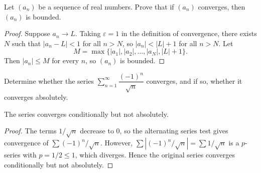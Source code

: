 \documentclass[name=Ada\ Lovelace, regnum=2027001, course=Real\ Analysis, num=6]{assignment}
\begin{document}
\maketitle

Let $(a_n)$ be a sequence of real numbers. Prove that if $(a_n)$
converges, then $(a_n)$ is bounded.

\begin{proof}
Suppose $a_n \to L$. Taking $\varepsilon = 1$ in the definition of
convergence, there exists $N$ such that $|a_n - L| < 1$ for all $n > N$,
so $|a_n| < |L| + 1$ for all $n > N$. Let
\[
  M = \max\{ |a_1|, |a_2|, \dots, |a_N|, |L| + 1 \}.
\]
Then $|a_n| \le M$ for every $n$, so $(a_n)$ is bounded.
\end{proof}

\separator

Determine whether the series $\sum_{n=1}^{\infty} \dfrac{(-1)^n}{\sqrt{n}}$
converges, and if so, whether it converges absolutely.

\begin{claim}
The series converges conditionally but not absolutely.
\end{claim}

\begin{proof}
The terms $1/\sqrt{n}$ decrease to $0$, so the alternating series test
gives convergence of $\sum (-1)^n / \sqrt{n}$. However,
$\sum |(-1)^n/\sqrt{n}| = \sum 1/\sqrt{n}$ is a $p$-series with
$p = 1/2 \le 1$, which diverges. Hence the original series converges
conditionally but not absolutely.
\end{proof}

\separator
\end{document}
